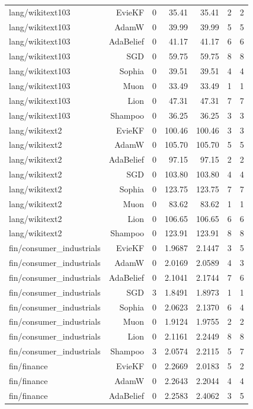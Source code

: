 \begin{table}[t]
\begin{tabular}{lrrrrrr}
lang/wikitext103 & EvieKF & 0 & 35.41 & 35.41 & 2 & 2 \\
lang/wikitext103 & AdamW & 0 & 39.99 & 39.99 & 5 & 5 \\
lang/wikitext103 & AdaBelief & 0 & 41.17 & 41.17 & 6 & 6 \\
lang/wikitext103 & SGD & 0 & 59.75 & 59.75 & 8 & 8 \\
lang/wikitext103 & Sophia & 0 & 39.51 & 39.51 & 4 & 4 \\
lang/wikitext103 & Muon & 0 & 33.49 & 33.49 & 1 & 1 \\
lang/wikitext103 & Lion & 0 & 47.31 & 47.31 & 7 & 7 \\
lang/wikitext103 & Shampoo & 0 & 36.25 & 36.25 & 3 & 3 \\
lang/wikitext2 & EvieKF & 0 & 100.46 & 100.46 & 3 & 3 \\
lang/wikitext2 & AdamW & 0 & 105.70 & 105.70 & 5 & 5 \\
lang/wikitext2 & AdaBelief & 0 & 97.15 & 97.15 & 2 & 2 \\
lang/wikitext2 & SGD & 0 & 103.80 & 103.80 & 4 & 4 \\
lang/wikitext2 & Sophia & 0 & 123.75 & 123.75 & 7 & 7 \\
lang/wikitext2 & Muon & 0 & 83.62 & 83.62 & 1 & 1 \\
lang/wikitext2 & Lion & 0 & 106.65 & 106.65 & 6 & 6 \\
lang/wikitext2 & Shampoo & 0 & 123.91 & 123.91 & 8 & 8 \\
fin/consumer\_industrials & EvieKF & 0 & 1.9687 & 2.1447 & 3 & 5 \\
fin/consumer\_industrials & AdamW & 0 & 2.0169 & 2.0589 & 4 & 3 \\
fin/consumer\_industrials & AdaBelief & 0 & 2.1041 & 2.1744 & 7 & 6 \\
fin/consumer\_industrials & SGD & 3 & 1.8491 & 1.8973 & 1 & 1 \\
fin/consumer\_industrials & Sophia & 0 & 2.0623 & 2.1370 & 6 & 4 \\
fin/consumer\_industrials & Muon & 0 & 1.9124 & 1.9755 & 2 & 2 \\
fin/consumer\_industrials & Lion & 0 & 2.1161 & 2.2449 & 8 & 8 \\
fin/consumer\_industrials & Shampoo & 3 & 2.0574 & 2.2115 & 5 & 7 \\
fin/finance & EvieKF & 0 & 2.2669 & 2.0183 & 5 & 2 \\
fin/finance & AdamW & 0 & 2.2643 & 2.2044 & 4 & 4 \\
fin/finance & AdaBelief & 0 & 2.2583 & 2.4062 & 3 & 5 \\

\end{tabular}
\end{table}
